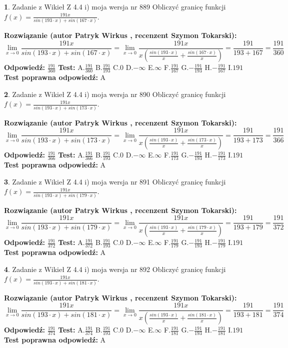 \documentclass[12pt, a4paper]{article}
\theoremstyle{definition} %
\newtheorem{zad}{}
\newcommand{\zadStart}[1]{\begin{zad}#1\newline}
\newcommand{\zadStop}{\end{zad}}
\newcommand{\rozwStart}[2]{\noindent \textbf{Rozwiązanie (autor #1 , recenzent #2): }\newline}
\newcommand{\rozwStop}{\newline}
\newcommand{\odpStart}{\noindent \textbf{Odpowiedź:}\newline}
\newcommand{\odpStop}{\newline}
\newcommand{\testStart}{\noindent \textbf{Test:}\newline}
\newcommand{\testStop}{\newline}
\newcommand{\kluczStart}{\noindent \textbf{Test poprawna odpowiedź:}\newline}
\newcommand{\kluczStop}{\newline}
\begin{document}
\zadStart{Zadanie z Wikieł Z 4.4 i) moja wersja nr 889}
Obliczyć granicę funkcji $f(x)=\frac{191x}{sin(193\cdot x) +sin(167\cdot x)}$.
\zadStop
\rozwStart{Patryk Wirkus}{Szymon Tokarski}
$$\lim\limits_{x\to 0}\frac{191x}{sin(193\cdot x) +sin(167\cdot x)}=\lim\limits_{x\to 0}\frac{191x}{x(\frac{sin(193\cdot x)}{x}+\frac{sin(167\cdot x)}{x})}=\frac{191}{193+167} = \frac{191}{360}$$
\rozwStop
\odpStart
$\frac{191}{360}$
\odpStop
\testStart
A.$\frac{191}{360}$
B.$\frac{191}{193}$
C.$0$
D.$-\infty$
E.$\infty$
F.$\frac{191}{167}$
G.$-\frac{191}{193}$
H.$-\frac{191}{167}$
I.$191$
\testStop
\kluczStart
A
\kluczStop



\zadStart{Zadanie z Wikieł Z 4.4 i) moja wersja nr 890}
Obliczyć granicę funkcji $f(x)=\frac{191x}{sin(193\cdot x) +sin(173\cdot x)}$.
\zadStop
\rozwStart{Patryk Wirkus}{Szymon Tokarski}
$$\lim\limits_{x\to 0}\frac{191x}{sin(193\cdot x) +sin(173\cdot x)}=\lim\limits_{x\to 0}\frac{191x}{x(\frac{sin(193\cdot x)}{x}+\frac{sin(173\cdot x)}{x})}=\frac{191}{193+173} = \frac{191}{366}$$
\rozwStop
\odpStart
$\frac{191}{366}$
\odpStop
\testStart
A.$\frac{191}{366}$
B.$\frac{191}{193}$
C.$0$
D.$-\infty$
E.$\infty$
F.$\frac{191}{173}$
G.$-\frac{191}{193}$
H.$-\frac{191}{173}$
I.$191$
\testStop
\kluczStart
A
\kluczStop



\zadStart{Zadanie z Wikieł Z 4.4 i) moja wersja nr 891}
Obliczyć granicę funkcji $f(x)=\frac{191x}{sin(193\cdot x) +sin(179\cdot x)}$.
\zadStop
\rozwStart{Patryk Wirkus}{Szymon Tokarski}
$$\lim\limits_{x\to 0}\frac{191x}{sin(193\cdot x) +sin(179\cdot x)}=\lim\limits_{x\to 0}\frac{191x}{x(\frac{sin(193\cdot x)}{x}+\frac{sin(179\cdot x)}{x})}=\frac{191}{193+179} = \frac{191}{372}$$
\rozwStop
\odpStart
$\frac{191}{372}$
\odpStop
\testStart
A.$\frac{191}{372}$
B.$\frac{191}{193}$
C.$0$
D.$-\infty$
E.$\infty$
F.$\frac{191}{179}$
G.$-\frac{191}{193}$
H.$-\frac{191}{179}$
I.$191$
\testStop
\kluczStart
A
\kluczStop



\zadStart{Zadanie z Wikieł Z 4.4 i) moja wersja nr 892}
Obliczyć granicę funkcji $f(x)=\frac{191x}{sin(193\cdot x) +sin(181\cdot x)}$.
\zadStop
\rozwStart{Patryk Wirkus}{Szymon Tokarski}
$$\lim\limits_{x\to 0}\frac{191x}{sin(193\cdot x) +sin(181\cdot x)}=\lim\limits_{x\to 0}\frac{191x}{x(\frac{sin(193\cdot x)}{x}+\frac{sin(181\cdot x)}{x})}=\frac{191}{193+181} = \frac{191}{374}$$
\rozwStop
\odpStart
$\frac{191}{374}$
\odpStop
\testStart
A.$\frac{191}{374}$
B.$\frac{191}{193}$
C.$0$
D.$-\infty$
E.$\infty$
F.$\frac{191}{181}$
G.$-\frac{191}{193}$
H.$-\frac{191}{181}$
I.$191$
\testStop
\kluczStart
A
\kluczStop
\end{document}
